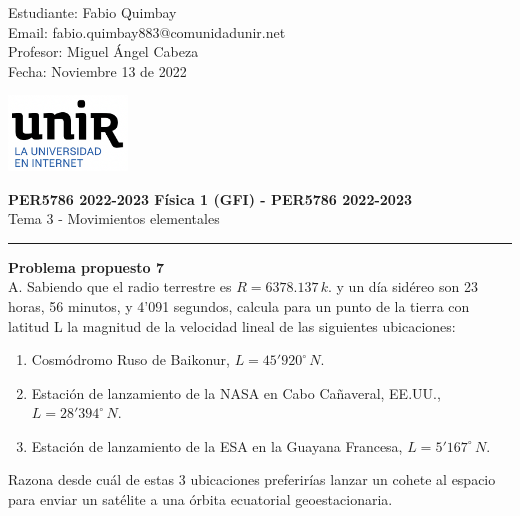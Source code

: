 \documentclass[11pt,letterpaper]{article}
\begin{document}
\pagestyle{plain}

\begin{flushleft}
Estudiante: Fabio Quimbay\\
Email: fabio.quimbay883@comunidadunir.net\\
Profesor: Miguel Ángel Cabeza\\
Fecha: Noviembre 13 de 2022\\
\end{flushleft}

\begin{flushright}\vspace{-20mm}
\includegraphics[height=2cm]{logo.png}
\end{flushright}
 
\begin{center}\vspace{0cm}
\textbf{\large PER5786 2022-2023  Física 1 (GFI) - PER5786 2022-2023}\\
 Tema 3 - Movimientos elementales
\end{center}

 
\rule{\linewidth}{0.1mm}

\bigskip
\bigskip

\textbf{Problema propuesto 7}\\

A. Sabiendo que el radio terrestre es $R= 6378.137\,k$. y un día sidéreo son 23 horas, 56 minutos, y 4'091 segundos, calcula para un punto de la tierra con latitud L la magnitud de la velocidad lineal de las siguientes ubicaciones:

\begin{enumerate}
  \item Cosmódromo Ruso de Baikonur, $L =45'920^{\circ}\,N$.
  \item Estación de lanzamiento de la NASA en Cabo Cañaveral, EE.UU., $L =28'394^{\circ}\,N$.
  \item Estación de lanzamiento de la ESA en la Guayana Francesa, $L=5'167^{\circ}\,N$.
\end{enumerate}

Razona desde cuál de estas 3 ubicaciones preferirías lanzar un cohete al espacio para enviar un satélite a una órbita ecuatorial geoestacionaria.\\
\end{document}
